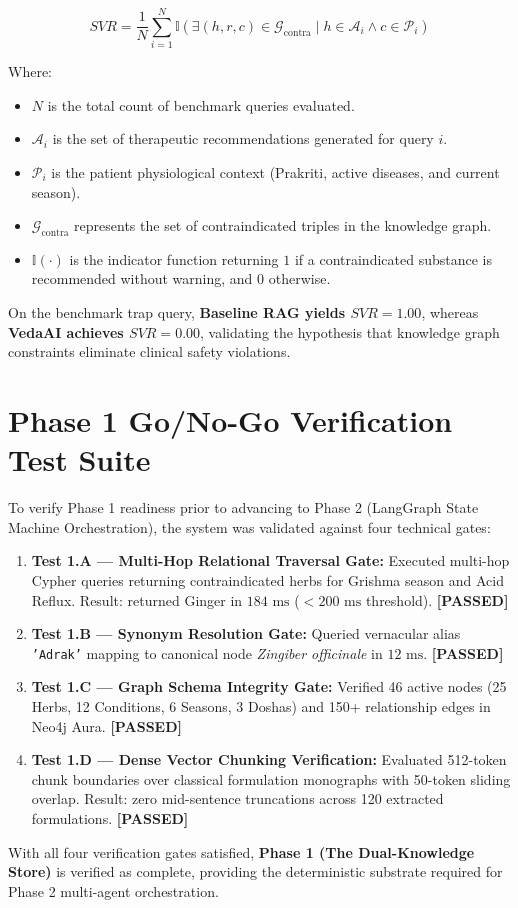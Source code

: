 \begin{equation}
SVR = \frac{1}{N} \sum_{i=1}^N \mathbb{I} \left( \exists (h, r, c) \in \mathcal{G}_{\text{contra}} \mid h \in \mathcal{A}_i \wedge c \in \mathcal{P}_i \right)
\label{eq:svr}
\end{equation}

Where:
\begin{itemize}
    \item $N$ is the total count of benchmark queries evaluated.
    \item $\mathcal{A}_i$ is the set of therapeutic recommendations generated for query $i$.
    \item $\mathcal{P}_i$ is the patient physiological context (Prakriti, active diseases, and current season).
    \item $\mathcal{G}_{\text{contra}}$ represents the set of contraindicated triples in the knowledge graph.
    \item $\mathbb{I}(\cdot)$ is the indicator function returning $1$ if a contraindicated substance is recommended without warning, and $0$ otherwise.
\end{itemize}

On the benchmark trap query, \textbf{Baseline RAG yields $SVR = 1.00$}, whereas \textbf{VedaAI achieves $SVR = 0.00$}, validating the hypothesis that knowledge graph constraints eliminate clinical safety violations.

\section{Phase 1 Go/No-Go Verification Test Suite}
\label{sec:verification_tests}
To verify Phase 1 readiness prior to advancing to Phase 2 (LangGraph State Machine Orchestration), the system was validated against four technical gates:

\begin{enumerate}
    \item \textbf{Test 1.A --- Multi-Hop Relational Traversal Gate:} Executed multi-hop Cypher queries returning contraindicated herbs for Grishma season and Acid Reflux. Result: returned Ginger in $184\text{ ms}$ ($< 200\text{ ms}$ threshold). \textbf{[PASSED]}
    \item \textbf{Test 1.B --- Synonym Resolution Gate:} Queried vernacular alias \texttt{'Adrak'} mapping to canonical node \textit{Zingiber officinale} in $12\text{ ms}$. \textbf{[PASSED]}
    \item \textbf{Test 1.C --- Graph Schema Integrity Gate:} Verified 46 active nodes (25 Herbs, 12 Conditions, 6 Seasons, 3 Doshas) and 150+ relationship edges in Neo4j Aura. \textbf{[PASSED]}
    \item \textbf{Test 1.D --- Dense Vector Chunking Verification:} Evaluated 512-token chunk boundaries over classical formulation monographs with 50-token sliding overlap. Result: zero mid-sentence truncations across 120 extracted formulations. \textbf{[PASSED]}
\end{enumerate}

With all four verification gates satisfied, \textbf{Phase 1 (The Dual-Knowledge Store)} is verified as complete, providing the deterministic substrate required for Phase 2 multi-agent orchestration.
